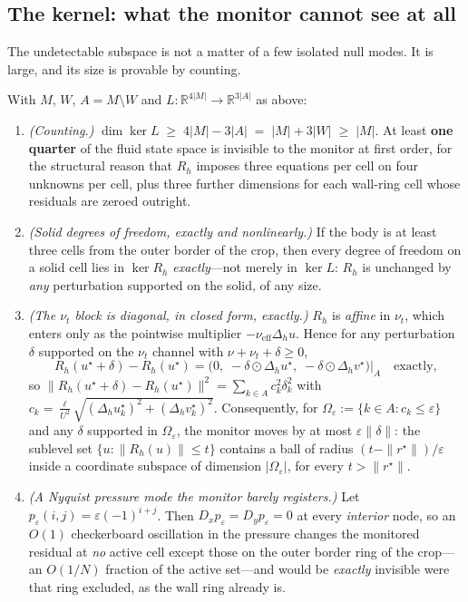 \subsection{The kernel: what the monitor cannot see at all}

The undetectable subspace is not a matter of a few isolated null modes. It is large, and
its size is provable by counting.

\begin{proposition}
\label{prop:kernel}
With $M$, $W$, $A=M\setminus W$ and $L:\mathbb{R}^{4|M|}\to\mathbb{R}^{3|A|}$ as above:
\begin{enumerate}
\item[\textup{(K1)}] \emph{(Counting.)}
$\dim\ker L\;\ge\;4|M|-3|A|\;=\;|M|+3|W|\;\ge\;|M|$. At least \textbf{one quarter} of the
fluid state space is invisible to the monitor at first order, for the structural reason
that $R_h$ imposes three equations per cell on four unknowns per cell, plus three further
dimensions for each wall-ring cell whose residuals are zeroed outright.
\item[\textup{(K2)}] \emph{(Solid degrees of freedom, exactly and nonlinearly.)} If the
body is at least three cells from the outer border of the crop, then every degree of
freedom on a solid cell lies in $\ker R_h$ \emph{exactly}---not merely in $\ker L$:
$R_h$ is unchanged by \emph{any} perturbation supported on the solid, of any size.
\item[\textup{(K3)}] \emph{(The $\nu_t$ block is diagonal, in closed form, exactly.)}
$R_h$ is \emph{affine} in $\nu_t$, which enters only as the pointwise multiplier
$-\nu_{\mathrm{eff}}\Delta_hu$. Hence for any perturbation $\delta$ supported on the
$\nu_t$ channel with $\nu+\nu_t+\delta\ge0$,
\begin{equation}
R_h(u^\star+\delta)-R_h(u^\star)
=\bigl(0,\;-\delta\odot\Delta_hu^\star,\;-\delta\odot\Delta_hv^\star\bigr)\big|_A
\quad\text{exactly},
\end{equation}
so $\|R_h(u^\star+\delta)-R_h(u^\star)\|^2=\sum_{k\in A}c_k^2\delta_k^2$ with
$c_k=\frac{\ell}{U^2}\sqrt{(\Delta_hu^\star_k)^2+(\Delta_hv^\star_k)^2}$. Consequently, for
$\Omega_\varepsilon:=\{k\in A:c_k\le\varepsilon\}$ and any $\delta$ supported in
$\Omega_\varepsilon$, the monitor moves by at most $\varepsilon\|\delta\|$: the sublevel
set $\{u:\|R_h(u)\|\le t\}$ contains a ball of radius $(t-\|r^\star\|)/\varepsilon$ inside
a coordinate subspace of dimension $|\Omega_\varepsilon|$, for every $t>\|r^\star\|$.
\item[\textup{(K4)}] \emph{(A Nyquist pressure mode the monitor barely registers.)} Let
$p_\varepsilon(i,j)=\varepsilon(-1)^{i+j}$. Then $D_xp_\varepsilon=D_yp_\varepsilon=0$ at
every \emph{interior} node, so an $O(1)$ checkerboard oscillation in the pressure changes
the monitored residual at \emph{no} active cell except those on the outer border ring of
the crop---an $O(1/N)$ fraction of the active set---and would be \emph{exactly} invisible
were that ring excluded, as the wall ring already is.
\end{enumerate}
\end{proposition}

